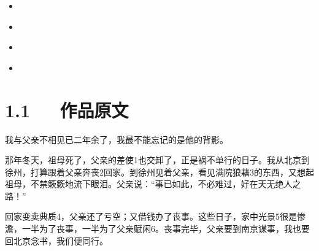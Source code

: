 \documentclass[letterpaper,10pt,english]{sphinxmanual}
\begin{document}
\begin{sphinxShadowBox}
\begin{itemize}
\begin{itemize}
\begin{itemize}
\item {} 
\label{\detokenize{p01_u6563_u6587/_u6731_u81ea_u6e05-_u80cc_u5f71:id21}}{\hyperref[\detokenize{p01_u6563_u6587/_u6731_u81ea_u6e05-_u80cc_u5f71:id9}]{}}

\end{itemize}

\item {} 
\label{\detokenize{p01_u6563_u6587/_u6731_u81ea_u6e05-_u80cc_u5f71:id22}}{\hyperref[\detokenize{p01_u6563_u6587/_u6731_u81ea_u6e05-_u80cc_u5f71:id10}]{}}

\item {} 
\label{\detokenize{p01_u6563_u6587/_u6731_u81ea_u6e05-_u80cc_u5f71:id23}}{\hyperref[\detokenize{p01_u6563_u6587/_u6731_u81ea_u6e05-_u80cc_u5f71:id11}]{}}

\item {} 
\label{\detokenize{p01_u6563_u6587/_u6731_u81ea_u6e05-_u80cc_u5f71:id24}}{\hyperref[\detokenize{p01_u6563_u6587/_u6731_u81ea_u6e05-_u80cc_u5f71:id12}]{}}

\item {} 
\label{\detokenize{p01_u6563_u6587/_u6731_u81ea_u6e05-_u80cc_u5f71:id25}}{\hyperref[\detokenize{p01_u6563_u6587/_u6731_u81ea_u6e05-_u80cc_u5f71:id13}]{}}

\end{itemize}

\end{itemize}
\end{sphinxShadowBox}


\section{1.1   作品原文}
\label{\detokenize{p01_u6563_u6587/_u6731_u81ea_u6e05-_u80cc_u5f71:id3}}
我与父亲不相见已二年余了，我最不能忘记的是他的背影。

那年冬天，祖母死了，父亲的差使1也交卸了，正是祸不单行的日子。我从北京到徐州，打算跟着父亲奔丧2回家。到徐州见着父亲，看见满院狼藉3的东西，又想起祖母，不禁簌簌地流下眼泪。父亲说：“事已如此，不必难过，好在天无绝人之路！”

回家变卖典质4，父亲还了亏空；又借钱办了丧事。这些日子，家中光景5很是惨澹，一半为了丧事，一半为了父亲赋闲6。丧事完毕，父亲要到南京谋事，我也要回北京念书，我们便同行。
\end{document}
